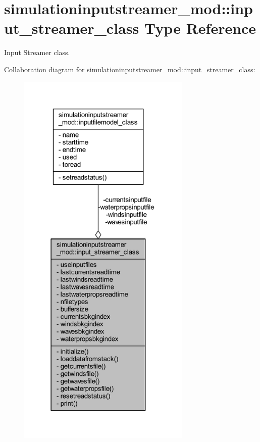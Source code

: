 \hypertarget{structsimulationinputstreamer__mod_1_1input__streamer__class}{}\section{simulationinputstreamer\+\_\+mod\+:\+:input\+\_\+streamer\+\_\+class Type Reference}
\label{structsimulationinputstreamer__mod_1_1input__streamer__class}


Input Streamer class.  




Collaboration diagram for simulationinputstreamer\+\_\+mod\+:\+:input\+\_\+streamer\+\_\+class\+:\nopagebreak
\begin{figure}[H]
\begin{center}
\leavevmode
\includegraphics[width=234pt]{structsimulationinputstreamer__mod_1_1input__streamer__class__coll__graph}
\end{center}
\end{figure}
